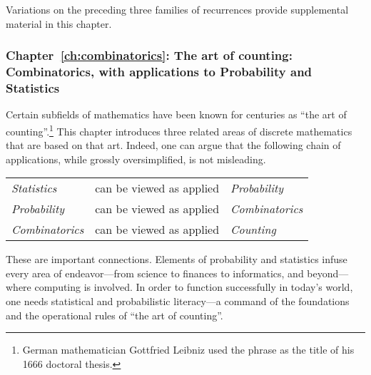 Variations on the preceding three families of recurrences provide supplemental material in this chapter.


\subsubsection{Chapter~\ref{ch:combinatorics}: 
The art of counting: Combinatorics, with applications to Probability and Statistics}

Certain subfields of mathematics have been known for centuries as ``the art of counting''.\footnote{German mathematician Gottfried Leibniz used the phrase as the title of his 1666 doctoral thesis.}  This chapter introduces three related areas of discrete mathematics that are based on that art.  Indeed, one can argue that the following chain of applications, while grossly oversimplified, is not misleading.

\smallskip

\begin{tabular}{lcl}
{\it Statistics} & can be viewed as applied & {\it Probability} \\
{\it Probability} & can be viewed as applied & {\it Combinatorics} \\
{\it Combinatorics} & can be viewed as applied & {\it Counting}
\end{tabular}

\smallskip

\noindent
These are important connections.  Elements of probability and statistics infuse every area of endeavor---from science to finances to informatics, and beyond---where computing is involved.  In order to function successfully in today's world, one needs statistical and probabilistic literacy---a command of the foundations and the operational rules of ``the art of counting''.

